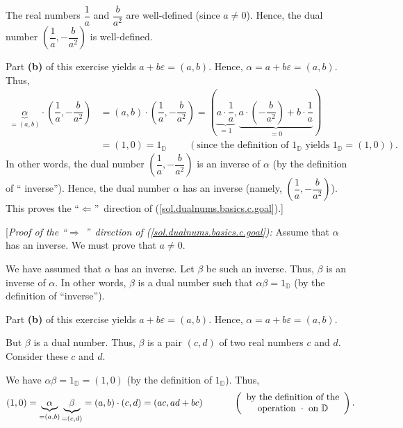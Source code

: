 \documentclass[paper=a4, fontsize=12pt]{scrartcl}%
\theoremstyle{plainsl}
\theoremstyle{definition}
\theoremstyle{remark}
\begin{document}
The real numbers $\dfrac{1}{a}$ and $\dfrac{b}{a^{2}}$ are well-defined (since
$a\neq0$). Hence, the dual number $\left(  \dfrac{1}{a},-\dfrac{b}{a^{2}%
}\right)  $ is well-defined.

Part \textbf{(b)} of this exercise yields $a+b\varepsilon=\left(  a,b\right)
$. Hence, $\alpha=a+b\varepsilon=\left(  a,b\right)  $. Thus,%
\begin{align*}
\underbrace{\alpha}_{=\left(  a,b\right)  }\cdot\left(  \dfrac{1}{a}%
,-\dfrac{b}{a^{2}}\right)   &  =\left(  a,b\right)  \cdot\left(  \dfrac{1}%
{a},-\dfrac{b}{a^{2}}\right)  =\left(  \underbrace{a\cdot\dfrac{1}{a}}%
_{=1},\underbrace{a\cdot\left(  -\dfrac{b}{a^{2}}\right)  +b\cdot\dfrac{1}{a}%
}_{=0}\right) \\
&  =\left(  1,0\right)  =1_{\mathbb{D}}\ \ \ \ \ \ \ \ \ \ \left(  \text{since
the definition of }1_{\mathbb{D}}\text{ yields }1_{\mathbb{D}}=\left(
1,0\right)  \right)  .
\end{align*}
In other words, the dual number $\left(  \dfrac{1}{a},-\dfrac{b}{a^{2}%
}\right)  $ is an inverse of $\alpha$ (by the definition of \textquotedblleft
inverse\textquotedblright). Hence, the dual number $\alpha$ has an inverse
(namely, $\left(  \dfrac{1}{a},-\dfrac{b}{a^{2}}\right)  $). This proves the
\textquotedblleft$\Longleftarrow$\textquotedblright\ direction of
(\ref{sol.dualnums.basics.c.goal}).]

[\textit{Proof of the \textquotedblleft}$\Longrightarrow$%
\textit{\textquotedblright\ direction of (\ref{sol.dualnums.basics.c.goal}):}
Assume that $\alpha$ has an inverse. We must prove that $a\neq0$.

We have assumed that $\alpha$ has an inverse. Let $\beta$ be such an inverse.
Thus, $\beta$ is an inverse of $\alpha$. In other words, $\beta$ is a dual
number such that $\alpha\beta=1_{\mathbb{D}}$ (by the definition of
\textquotedblleft inverse\textquotedblright).

Part \textbf{(b)} of this exercise yields $a+b\varepsilon=\left(  a,b\right)
$. Hence, $\alpha=a+b\varepsilon=\left(  a,b\right)  $.

But $\beta$ is a dual number. Thus, $\beta$ is a pair $\left(  c,d\right)  $
of two real numbers $c$ and $d$. Consider these $c$ and $d$.

We have $\alpha\beta=1_{\mathbb{D}}=\left(  1,0\right)  $ (by the definition
of $1_{\mathbb{D}}$). Thus,
\[
\left(  1,0\right)  =\underbrace{\alpha}_{=\left(  a,b\right)  }%
\underbrace{\beta}_{=\left(  c,d\right)  }=\left(  a,b\right)  \cdot\left(
c,d\right)  =\left(  ac,ad+bc\right)  \ \ \ \ \ \ \ \ \ \ \left(
\begin{array}
[c]{c}%
\text{by the definition of the}\\
\text{operation }\cdot\text{ on }\mathbb{D}%
\end{array}
\right)  .
\]
\end{document}

